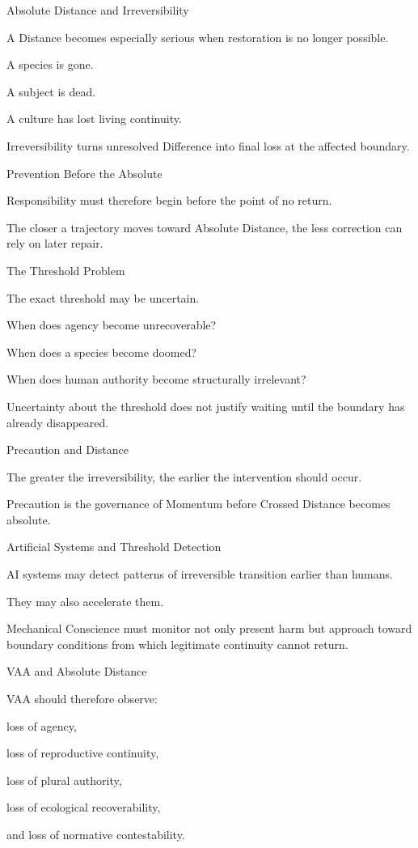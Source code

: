 Absolute Distance and Irreversibility

A Distance becomes especially serious when restoration is no longer possible.

A species is gone.

A subject is dead.

A culture has lost living continuity.

Irreversibility turns unresolved Difference into final loss at the affected boundary.

Prevention Before the Absolute

Responsibility must therefore begin before the point of no return.

The closer a trajectory moves toward Absolute Distance, the less correction can rely on later repair.

The Threshold Problem

The exact threshold may be uncertain.

When does agency become unrecoverable?

When does a species become doomed?

When does human authority become structurally irrelevant?

Uncertainty about the threshold does not justify waiting until the boundary has already disappeared.

Precaution and Distance

The greater the irreversibility, the earlier the intervention should occur.

Precaution is the governance of Momentum before Crossed Distance becomes absolute.

Artificial Systems and Threshold Detection

AI systems may detect patterns of irreversible transition earlier than humans.

They may also accelerate them.

Mechanical Conscience must monitor not only present harm but approach toward boundary conditions from which legitimate continuity cannot return.

VAA and Absolute Distance

VAA should therefore observe:

loss of agency,

loss of reproductive continuity,

loss of plural authority,

loss of ecological recoverability,

and loss of normative contestability.

